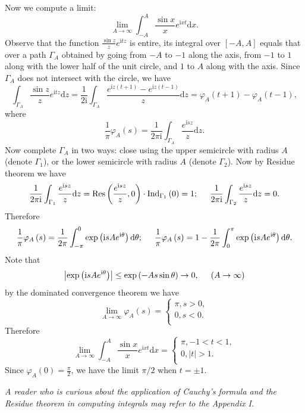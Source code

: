 Now we compute a limit: 
$$
\lim_{A\rightarrow \infty} \int_{-A}^A{\frac{\sin x}{x}e^{\mathrm{i}xt}\mathrm{d}x}.
$$
Observe that the function $\frac{\sin z}{z}e^{\mathrm{i}tz}$ is entire, its integral over $[-A,A]$ equals that over a path $\Gamma_A$ obtained by going from $-A$ to $-1$ along the axis, from $-1$ to $1$ along with the lower half of the unit circle, and $1$ to $A$ along with the axis. Since $\Gamma_A$ does not intersect with the circle, we have 
$$
\int_{\Gamma _A}{\frac{\sin z}{z}e^{\mathrm{i}tz}\mathrm{d}z}=\frac{1}{2\mathrm{i}}\int_{\Gamma _A}{\frac{e^{\mathrm{i}z\left( t+1 \right)}-e^{\mathrm{i}z\left( t-1 \right)}}{z}\mathrm{d}z}=\varphi _A\left( t+1 \right) -\varphi _A\left( t-1 \right) ,
$$
where 
$$
\frac{1}{\pi}\varphi _A\left( s \right) =\frac{1}{2\pi \mathrm{i}}\int_{\Gamma _A}{\frac{e^{\mathrm{i}sz}}{z}\mathrm{d}z}.
$$
Now complete $\Gamma_A$ in two ways: close using the upper semicircle with radius $A$ (denote $\Gamma_1$), or the lower semicircle with radius $A$ (denote $\Gamma_2$). Now by Residue theorem we have 
$$
\frac{1}{2\pi \mathrm{i}}\int_{\Gamma _1}{\frac{e^{\mathrm{i}sz}}{z}\mathrm{d}z}=\mathrm{Res}\left( \frac{e^{\mathrm{i}sz}}{z},0 \right) \cdot \mathrm{Ind}_{\Gamma _1}\left( 0 \right) =1;\hspace{0.5cm}\frac{1}{2\pi \mathrm{i}}\int_{\Gamma _2}{\frac{e^{\mathrm{i}sz}}{z}\mathrm{d}z}=0.
$$
Therefore 
$$
\frac{1}{\pi}\varphi _A\left( s \right) =\frac{1}{2\pi}\int_{-\pi}^0{\exp \left( \mathrm{i}sAe^{\mathrm{i}\theta} \right) \mathrm{d}\theta};\hspace{0.5cm}\frac{1}{\pi}\varphi _A\left( s \right) =1-\frac{1}{2\pi}\int_0^{\pi}{\exp \left( \mathrm{i}sAe^{\mathrm{i}\theta} \right) \mathrm{d}\theta}.
$$
Note that 
$$
\left| \exp \left( \mathrm{i}sAe^{\mathrm{i}\theta} \right) \right|\le \exp \left( -As\sin \theta \right) \rightarrow 0,\hspace{0.5cm}\left( A\rightarrow \infty \right) 
$$
by the dominated convergence theorem we have 
$$
\lim_{A\rightarrow \infty} \varphi _A\left( s \right) =\begin{cases}
	\pi ,s>0,\\
	0,s<0.\\
\end{cases}
$$
Therefore 
$$
\lim_{A\rightarrow \infty} \int_{-A}^A{\frac{\sin x}{x}e^{\mathrm{i}xt}\mathrm{d}x}=\begin{cases}
	\pi ,-1<t<1,\\
	0,\left| t \right|>1.\\
\end{cases}
$$
Since $\varphi_A(0)=\frac{\pi}{2}$, we have the limit $\pi/2$ when $t=\pm 1$.
\begin{note}\em
A reader who is curious about the application of Cauchy's formula and the Residue theorem in computing integrals may refer to the Appendix I.
\end{note}
